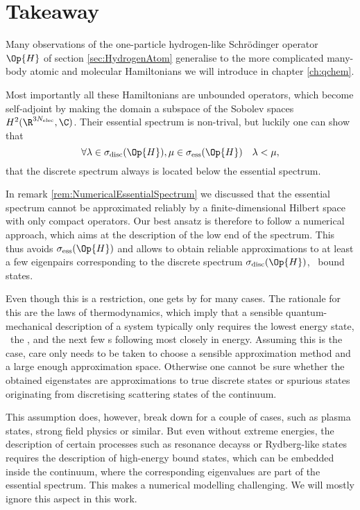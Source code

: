 \section{Takeaway}
\label{sec:SpectralTakeAway}
Many observations of the one-particle hydrogen-like Schrödinger operator $\Op{H}$
of section \vref{sec:HydrogenAtom}
generalise to the more complicated many-body atomic and molecular Hamiltonians
we will introduce in chapter \vref{ch:qchem}.

Most importantly all these Hamiltonians are unbounded operators,
which become self-adjoint by making the domain
a subspace of the Sobolev spaces $H^2(\R^{3\Nelec}, \C)$.
Their essential spectrum is non-trival,
but luckily one can show~\cite{Zhislin1959,Zhislin1960,Reed1978,Teschl2014} that
\[ \forall \lambda \in \sigma_{\text{disc}}(\Op{H}),
	\mu \in \sigma_{\text{ess}}(\Op{H}) \quad \lambda < \mu, \]
\ie that the discrete spectrum always is located below the essential spectrum.

In remark \vref{rem:NumericalEssentialSpectrum} we discussed
that the essential spectrum cannot be approximated reliably
by a finite-dimensional Hilbert space with only compact operators.
Our best ansatz is therefore to follow a numerical approach,
which aims at the description of the low end of the spectrum.
This thus avoids $\sigma_{\text{ess}}(\Op{H})$
and allows to obtain reliable approximations to at least a few
eigenpairs corresponding to the discrete spectrum $\sigma_{\text{disc}}(\Op{H})$,
\ie~bound states.

Even though this is a restriction, one gets by for many cases.
The rationale for this are the laws of thermodynamics,
which imply that a sensible quantum-mechanical description of a system
typically only requires the lowest energy state,
\ie~the , and the next few s
following most closely in energy.
Assuming this is the case,
care only needs to be taken to choose a sensible approximation
method and a large enough approximation space.
Otherwise one cannot be sure whether the obtained eigenstates
are approximations to true discrete states
or spurious states originating from discretising scattering states
of the continuum.

This assumption does, however, break down for a couple of cases,
such as plasma states,
strong field physics or similar.
But even without extreme energies, the description of certain
processes such as resonance decayss or Rydberg-like states
requires the description of high-energy bound states,
which can be embedded inside the continuum,
\ie where the corresponding eigenvalues are part of the essential spectrum.
This makes a numerical modelling challenging.
We will mostly ignore this aspect in this work.
